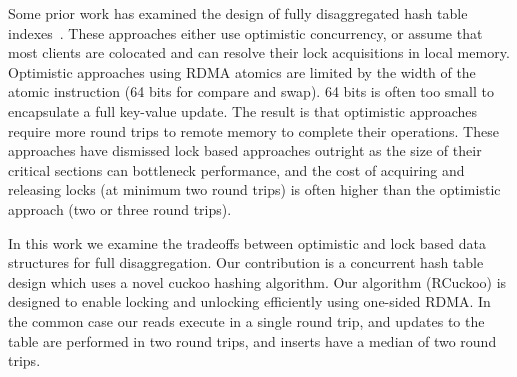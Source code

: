 Some prior work has examined the design of fully
disaggregated hash table indexes~\cite{rolex,fusee,sherman,
race}.  These approaches either use optimistic
concurrency, or assume that most clients are colocated and
can resolve their lock acquisitions in local memory.
Optimistic approaches using RDMA atomics are limited by the
width of the atomic instruction (64 bits for compare and
swap). 64 bits is often too small to encapsulate a full
key-value update. The result is that optimistic approaches
require more round trips to remote memory to complete their
operations. These approaches have dismissed lock based
approaches outright as the size of their critical sections
can bottleneck performance, and  the cost of acquiring and
releasing locks (at minimum two round trips) is often higher
than the optimistic approach (two or three round trips).



In this work we examine the tradeoffs between optimistic and
lock based data structures for full disaggregation. Our
contribution is a concurrent hash table design which uses a
novel cuckoo hashing algorithm. Our algorithm (RCuckoo) is
designed to enable locking and unlocking efficiently using
one-sided RDMA. In the common case our reads execute in a
single round trip, and updates to the table are performed in
two round trips, and inserts have a median of two round
trips.

